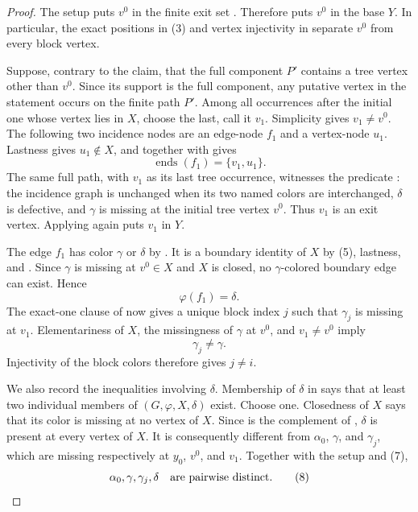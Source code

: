 \begin{proof}
The setup puts $v^0$ in the finite exit set
.  Therefore
 puts $v^0$ in the base $Y$.
In particular, the exact positions in (3) and vertex injectivity in
 separate $v^0$ from every block vertex.

Suppose, contrary to the claim, that the full component $P'$ contains a
tree vertex other than $v^0$.  Since its support is the full component,
any putative vertex in the statement occurs on the finite path $P'$.
Among all occurrences after the initial one whose vertex lies in $X$,
choose the last, call it $v_1$.  Simplicity gives
$v_1\ne v^0$.  The following two incidence nodes are an edge-node $f_1$
and a vertex-node $u_1$.  Lastness gives $u_1\notin X$, and
 together with
 gives
\[
 \operatorname{ends}(f_1)=\{v_1,u_1\}.                       \tag{5}
\]
The same full path, with $v_1$ as its last tree occurrence, witnesses the
predicate : the incidence graph is unchanged
when its two named colors are interchanged, $\delta$ is defective, and
$\gamma$ is missing at the initial tree vertex $v^0$.  Thus $v_1$ is an
exit vertex.  Applying  again puts
$v_1$ in $Y$.

The edge $f_1$ has color $\gamma$ or $\delta$ by
.  It is a boundary identity of $X$ by
(5), lastness, and .  Since $\gamma$ is missing
at $v^0\in X$ and $X$ is closed, no $\gamma$-colored boundary edge can
exist.  Hence
\[
 \varphi(f_1)=\delta.                                        \tag{6}
\]
The exact-one clause of  now gives
a unique block index $j$ such that $\gamma_j$ is missing at $v_1$.
Elementariness of $X$, the missingness of $\gamma$ at $v^0$, and
$v_1\ne v^0$ imply
\[
 \gamma_j\ne\gamma.                                         \tag{7}
\]
Injectivity of the block colors therefore gives $j\ne i$.

We also record the inequalities involving $\delta$.  Membership of
$\delta$ in  says that at least two individual
members of
$(G,\varphi,X,\delta)$ exist.  Choose one.
Closedness of $X$ says that its color is missing at no vertex of $X$.
Since  is the complement of
, $\delta$ is present at every vertex of $X$.
It is consequently different from $\alpha _0$, $\gamma$, and
$\gamma_j$, which are missing respectively at $y_0$, $v^0$, and $v_1$.
Together with the setup and (7),
\[
 \alpha _0,\gamma,\gamma_j,\delta
 \quad\hbox{are pairwise distinct}.                          \tag{8}
\]


\end{proof}
